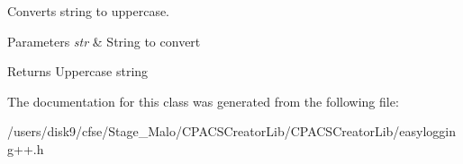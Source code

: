 Converts string to uppercase. 


\begin{DoxyParams}{Parameters}
{\em str} & String to convert \\
\hline
\end{DoxyParams}
\begin{DoxyReturn}{Returns}
Uppercase string 
\end{DoxyReturn}


The documentation for this class was generated from the following file\-:\begin{DoxyCompactItemize}
\item 
/users/disk9/cfse/\-Stage\-\_\-\-Malo/\-C\-P\-A\-C\-S\-Creator\-Lib/\-C\-P\-A\-C\-S\-Creator\-Lib/easylogging++.\-h\end{DoxyCompactItemize}
